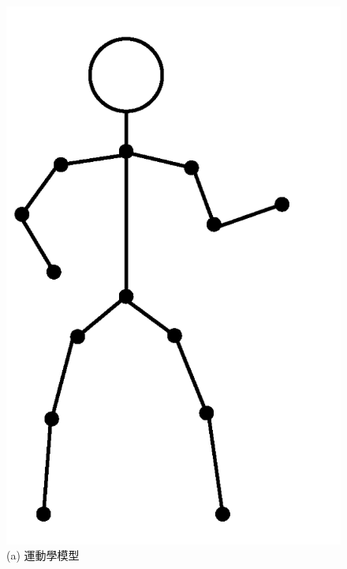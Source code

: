 \begin{figure}[!ht]
    \centering
    \begin{minipage}{.33\textwidth}
       \centering
       \includegraphics[width=.95\linewidth]{figure/ch2_fig_personal_kinematic_model.png}
       \caption*{(a) 運動學模型}
    \end{minipage}%
    \begin{minipage}{.33\textwidth}
       \centering

\end{minipage}
\end{figure}
